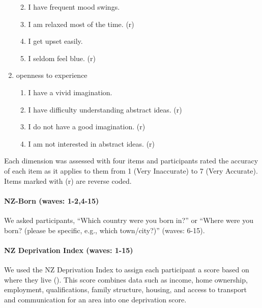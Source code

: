 \documentclass[
  singlecolumn]{article}
\let\oldparagraph\paragraph
\renewcommand{\paragraph}[1]{\oldparagraph{#1}\mbox{}}
\providecommand{\tightlist}{%
  \setlength{\itemsep}{0pt}\setlength{\parskip}{0pt}}\usepackage{longtable,booktabs,array}
\begin{document}
\begin{enumerate}
  \begin{enumerate}
  \def\labelenumii{\roman{enumii}.}
  \tightlist
  \item
    I have frequent mood swings.
  \item
    I am relaxed most of the time. (r)
  \item
    I get upset easily.
  \item
    I seldom feel blue. (r)
  \end{enumerate}
\item
  openness to experience

  \begin{enumerate}
  \def\labelenumii{\roman{enumii}.}
  \tightlist
  \item
    I have a vivid imagination.
  \item
    I have difficulty understanding abstract ideas. (r)
  \item
    I do not have a good imagination. (r)
  \item
    I am not interested in abstract ideas. (r)
  \end{enumerate}
\end{enumerate}

Each dimension was assessed with four items and participants rated the
accuracy of each item as it applies to them from 1 (Very Inaccurate) to
7 (Very Accurate). Items marked with (r) are reverse coded.

\paragraph{NZ-Born (waves: 1-2,4-15)}\label{nz-born-waves-1-24-15}

We asked participants, ``Which country were you born in?'' or ``Where
were you born? (please be specific, e.g., which town/city?)'' (waves:
6-15).

\paragraph{NZ Deprivation Index (waves:
1-15)}\label{nz-deprivation-index-waves-1-15}

We used the NZ Deprivation Index to assign each participant a score
based on where they live (). This score combines data such as income, home ownership,
employment, qualifications, family structure, housing, and access to
transport and communication for an area into one deprivation score.
\end{document}

